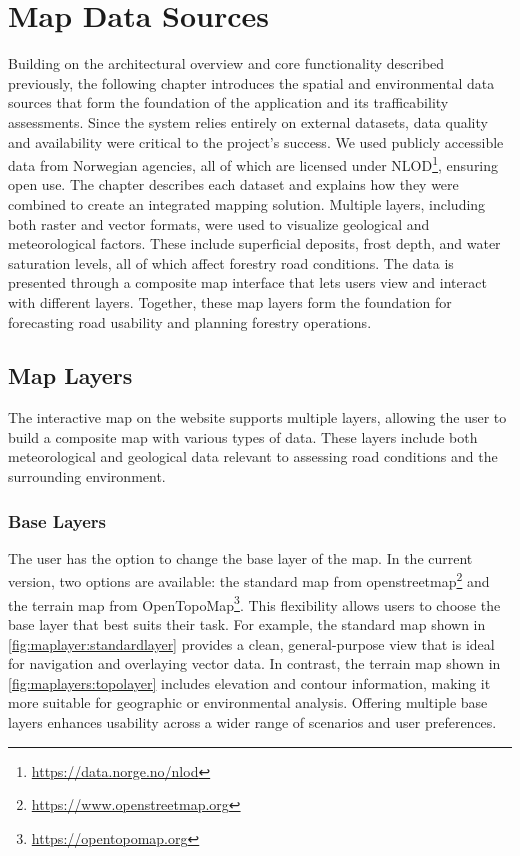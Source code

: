 \chapter{Map Data Sources}\label{chap:mapdatasources}

Building on the architectural overview and core functionality described previously, the following chapter introduces the spatial and environmental data sources that form the foundation of the application and its trafficability assessments. Since the system relies entirely on external datasets, data quality and availability were critical to the project's success. We used publicly accessible data from Norwegian agencies, all of which are licensed under NLOD\footnote{\url{https://data.norge.no/nlod}}, ensuring open use. The chapter describes each dataset and explains how they were combined to create an integrated mapping solution. Multiple layers, including both raster and vector formats, were used to visualize geological and meteorological factors. These include superficial deposits, frost depth, and water saturation levels, all of which affect forestry road conditions. The data is presented through a composite map interface that lets users view and interact with different layers. Together, these map layers form the foundation for forecasting road usability and planning forestry operations.

\section{Map Layers}\label{sec:maplayers}

The interactive map on the website supports multiple layers, allowing the user to build a composite map with various types of data. These layers include both meteorological and geological data relevant to assessing road conditions and the surrounding environment.

\subsection{Base Layers}\label{subsec:baselayers}

The user has the option to change the base layer of the map. In the current version, two options are available: the standard map from \gls{openstreetmap}\footnote{\url{https://www.openstreetmap.org}} and the terrain map from OpenTopoMap\footnote{\url{https://opentopomap.org}}. This flexibility allows users to choose the base layer that best suits their task. For example, the standard map shown in \autoref{fig:maplayer:standardlayer} provides a clean, general-purpose view that is ideal for navigation and overlaying vector data. In contrast, the terrain map shown in \autoref{fig:maplayers:topolayer} includes elevation and contour information, making it more suitable for geographic or environmental analysis. Offering multiple base layers enhances usability across a wider range of scenarios and user preferences.

